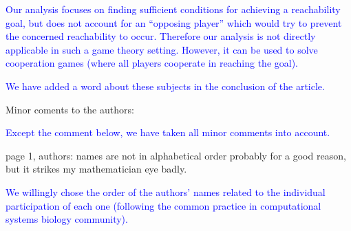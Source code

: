 \documentclass[11pt]{article}
\newcommand{\ilanswer}[1]{\textcolor{blue}{#1}}
\newcommand{\answer}[1]{\ilanswer{#1}\vspace*{1em}}
\begin{document}

\ilanswer{
Our analysis focuses on finding sufficient conditions for achieving a
reachability goal, but does not account for an “opposing player” which would
try to prevent the concerned reachability to occur.
Therefore our analysis is not directly applicable in such a game theory setting.
However, it can be used to solve cooperation games
(where all players cooperate in reaching the goal).
}

\answer{
We have added a word about these subjects in the conclusion of the article.
}



\noindent
Minor coments to the authors:

\answer{Except the comment below, we have taken all minor comments into account.}

\noindent
page 1, authors: names are not in alphabetical order probably for a good reason, but it strikes my mathematician eye badly.

\answer{We willingly chose the order of the authors' names related to the individual participation
of each one (following the common practice in computational systems biology community).}
\end{document}
